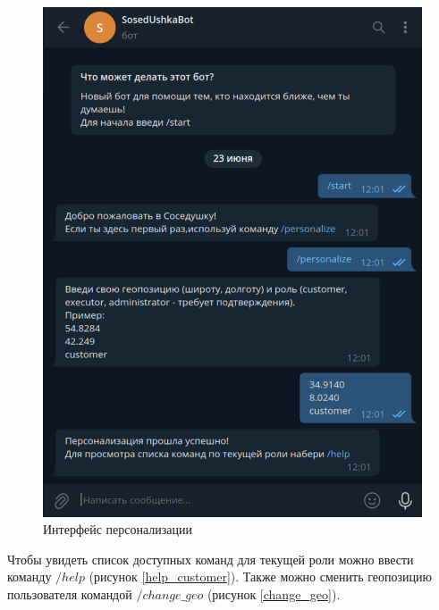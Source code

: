 
\begin{figure}[H]
	\begin{center}
		\includegraphics[page=1,scale=0.4]{assets/personalize.pdf}
	\end{center}
	\caption{Интерфейс персонализации}
	\label{personalize}
\end{figure}

Чтобы увидеть список доступных команд для текущей роли можно ввести команду $/help$ (рисунок \ref{help_customer}). Также можно сменить геопозицию пользователя командой $/change\_geo$ (рисунок \ref{change_geo}).

